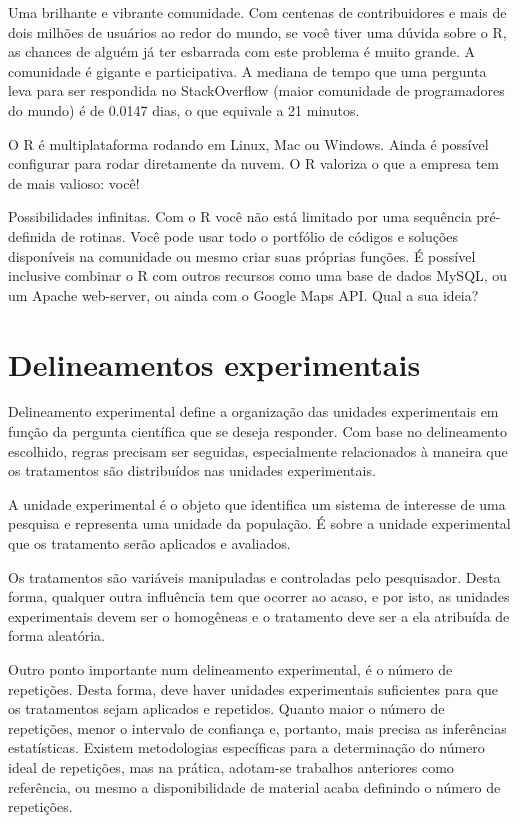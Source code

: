 \documentclass[
]{article}
\begin{document}
Uma brilhante e vibrante comunidade. Com centenas de contribuidores e mais de dois milhões de usuários ao redor do mundo, se você tiver uma dúvida sobre o R, as chances de alguém já ter esbarrada com este problema é muito grande. A comunidade é gigante e participativa. A mediana de tempo que uma pergunta leva para ser respondida no StackOverflow (maior comunidade de programadores do mundo) é de 0.0147 dias, o que equivale a 21 minutos.

O R é multiplataforma rodando em Linux, Mac ou Windows. Ainda é possível configurar para rodar diretamente da nuvem. O R valoriza o que a empresa tem de mais valioso: você!

Possibilidades infinitas. Com o R você não está limitado por uma sequência pré-definida de rotinas. Você pode usar todo o portfólio de códigos e soluções disponíveis na comunidade ou mesmo criar suas próprias funções. É possível inclusive combinar o R com outros recursos como uma base de dados MySQL, ou um Apache web-server, ou ainda com o Google Maps API. Qual a sua ideia?

\hypertarget{delineamentos-experimentais}{%
\section{Delineamentos experimentais}\label{delineamentos-experimentais}}

Delineamento experimental define a organização das unidades experimentais em função da pergunta científica que se deseja responder. Com base no delineamento escolhido, regras precisam ser seguidas, especialmente relacionados à maneira que os tratamentos são distribuídos nas unidades experimentais.

A unidade experimental é o objeto que identifica um sistema de interesse de uma pesquisa e representa uma unidade da população. É sobre a unidade experimental que os tratamento serão aplicados e avaliados.

Os tratamentos são variáveis manipuladas e controladas pelo pesquisador. Desta forma, qualquer outra influência tem que ocorrer ao acaso, e por isto, as unidades experimentais devem ser o homogêneas e o tratamento deve ser a ela atribuída de forma aleatória.

Outro ponto importante num delineamento experimental, é o número de repetições. Desta forma, deve haver unidades experimentais suficientes para que os tratamentos sejam aplicados e repetidos. Quanto maior o número de repetições, menor o intervalo de confiança e, portanto, mais precisa as inferências estatísticas. Existem metodologias específicas para a determinação do número ideal de repetições, mas na prática, adotam-se trabalhos anteriores como referência, ou mesmo a disponibilidade de material acaba definindo o número de repetições.
\end{document}
